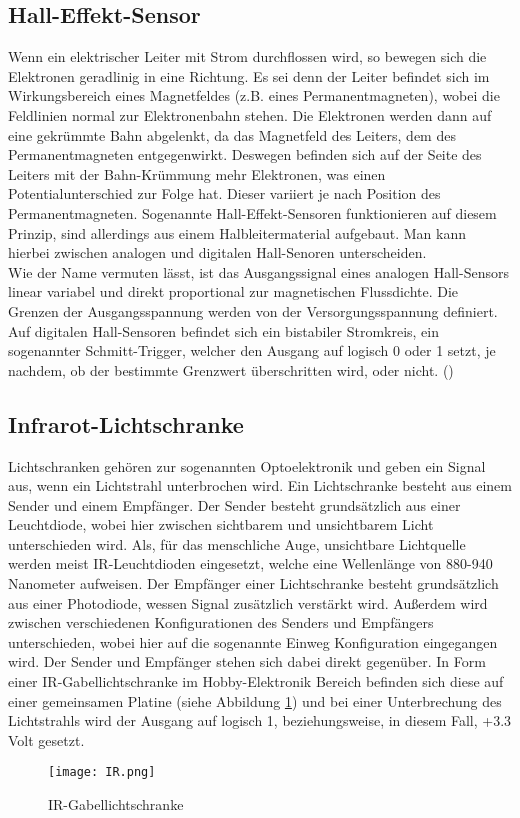 \subsection{Hall-Effekt-Sensor}
\label{subsec:tHall}
Wenn ein elektrischer Leiter mit Strom durchflossen wird, so bewegen sich die Elektronen geradlinig in eine Richtung. Es sei denn der Leiter befindet sich im Wirkungsbereich eines Magnetfeldes (z.B. eines Permanentmagneten), wobei die Feldlinien normal zur Elektronenbahn stehen. Die Elektronen werden dann auf eine gekrümmte Bahn abgelenkt, da das Magnetfeld des Leiters, dem des Permanentmagneten entgegenwirkt. Deswegen befinden sich auf der Seite des Leiters mit der Bahn-Krümmung mehr Elektronen, was einen Potentialunterschied zur Folge hat. Dieser variiert je nach Position des Permanentmagneten. Sogenannte Hall-Effekt-Sensoren funktionieren auf diesem Prinzip, sind allerdings aus einem Halbleitermaterial aufgebaut. Man kann hierbei zwischen analogen und digitalen Hall-Senoren unterscheiden.\\
Wie der Name vermuten lässt, ist das Ausgangssignal eines analogen Hall-Sensors linear variabel und direkt proportional zur magnetischen Flussdichte. Die Grenzen der Ausgangsspannung werden von der Versorgungsspannung definiert. Auf digitalen Hall-Sensoren befindet sich ein bistabiler Stromkreis, ein sogenannter Schmitt-Trigger, welcher den Ausgang auf logisch 0 oder 1 setzt, je nachdem, ob der bestimmte Grenzwert überschritten wird, oder nicht. (\cite{rsHALL})

\subsection{Infrarot-Lichtschranke}
\label{subsec:tIR}
Lichtschranken gehören zur sogenannten Optoelektronik und geben ein Signal aus, wenn ein Lichtstrahl unterbrochen wird. Ein Lichtschranke besteht aus einem Sender und einem Empfänger. Der Sender besteht grundsätzlich aus einer Leuchtdiode, wobei hier zwischen sichtbarem und unsichtbarem Licht unterschieden wird. Als, für das menschliche Auge, unsichtbare Lichtquelle werden meist \ac{IR}-Leuchtdioden eingesetzt, welche eine Wellenlänge von 880-940 Nanometer aufweisen. Der Empfänger einer Lichtschranke besteht grundsätzlich aus einer Photodiode, wessen Signal zusätzlich verstärkt wird. Außerdem wird zwischen verschiedenen Konfigurationen des Senders und Empfängers unterschieden, wobei hier auf die sogenannte Einweg Konfiguration eingegangen wird. Der Sender und Empfänger stehen sich dabei direkt gegenüber. In Form einer \ac{IR}-Gabellichtschranke im Hobby-Elektronik Bereich befinden sich diese auf einer gemeinsamen Platine (siehe Abbildung \ref{fig:IR}) und bei einer Unterbrechung des Lichtstrahls wird der Ausgang auf logisch 1, beziehungsweise, in diesem Fall, +3.3 Volt gesetzt.
\begin{figure}[h]
\centering
\texttt{[image: IR.png]}
\caption{IR-Gabellichtschranke}
\label{fig:IR}
\end{figure}

